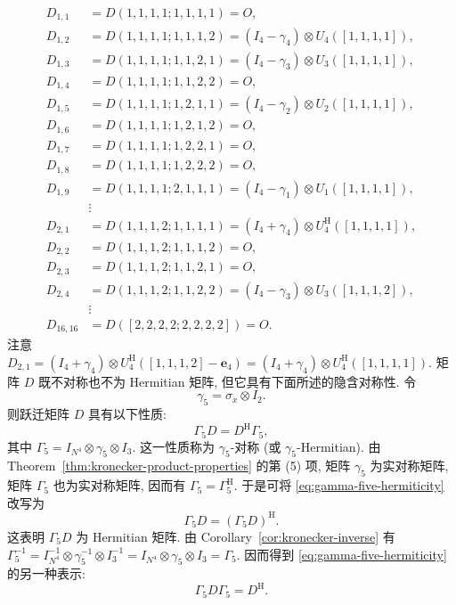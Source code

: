 \[\begin{aligned}
D_{1,1}&=D(1,1,1,1;1,1,1,1)=O,\\
D_{1,2}&=D(1,1,1,1;1,1,1,2)=(I_4-\gamma_4)\otimes U_4([1,1,1,1]),\\
D_{1,3}&=D(1,1,1,1;1,1,2,1)=(I_4-\gamma_3)\otimes U_3([1,1,1,1]),\\
D_{1,4}&=D(1,1,1,1;1,1,2,2)=O,\\
D_{1,5}&=D(1,1,1,1;1,2,1,1)=(I_4-\gamma_2)\otimes U_2([1,1,1,1]),\\
D_{1,6}&=D(1,1,1,1;1,2,1,2)=O,\\
D_{1,7}&=D(1,1,1,1;1,2,2,1)=O,\\
D_{1,8}&=D(1,1,1,1;1,2,2,2)=O,\\
D_{1,9}&=D(1,1,1,1;2,1,1,1)=(I_4-\gamma_1)\otimes U_1([1,1,1,1]),\\
&\vdots\\
D_{2,1}&=D(1,1,1,2;1,1,1,1)=(I_4+\gamma_4)\otimes U_4^{\mathrm H}([1,1,1,1]),\\
D_{2,2}&=D(1,1,1,2;1,1,1,2)=O,\\
D_{2,3}&=D(1,1,1,2;1,1,2,1)=O,\\
D_{2,4}&=D(1,1,1,2;1,1,2,2)=(I_4-\gamma_3)\otimes U_3([1,1,1,2]),\\
&\vdots\\
D_{16,16}&=D([2,2,2,2;2,2,2,2])=O.
\end{aligned}\]
{注意 $D_{2,1}=(I_4+\gamma_4)\otimes U_4^{\mathrm H}([1,1,1,2]-\boldsymbol{e}_4)=(I_4+\gamma_4)\otimes U_4^{\mathrm H}([1,1,1,1])$. 矩阵 $D$ 既不对称也不为 Hermitian 矩阵, 但它具有下面所述的隐含对称性. 令}
\[\gamma_5=\sigma_x\otimes I_2.\]
{则跃迁矩阵 $D$ 具有以下性质:}
\begin{equation}\label{eq:gamma-five-hermiticity}
\Gamma_5D=D^{\mathrm H}\Gamma_5,
\end{equation}
{其中 $\Gamma_5=I_{N^4}\otimes\gamma_5\otimes I_3$. 这一性质称为 $\gamma_5$-对称 (或 $\gamma_5$-Hermitian). 由 Theorem\ \ref{thm:kronecker-product-properties} 的第 (5) 项, 矩阵 $\gamma_5$ 为实对称矩阵, 矩阵 $\Gamma_5$ 也为实对称矩阵, 因而有 $\Gamma_5=\Gamma_5^{\mathrm H}$. 于是可将 \eqref{eq:gamma-five-hermiticity} 改写为}
\[\Gamma_5D=(\Gamma_5D)^{\mathrm H}.\]
{这表明 $\Gamma_5D$ 为 Hermitian 矩阵. 由 Corollary\ \ref{cor:kronecker-inverse} 有 $\Gamma_5^{-1}=I_{N^4}^{-1}\otimes\gamma_5^{-1}\otimes I_3^{-1}=I_{N^4}\otimes\gamma_5\otimes I_3=\Gamma_5$. 因而得到 \eqref{eq:gamma-five-hermiticity} 的另一种表示:}
\begin{equation}\label{eq:gamma-five-similarity}
\Gamma_5D\Gamma_5=D^{\mathrm H}.
\end{equation}
